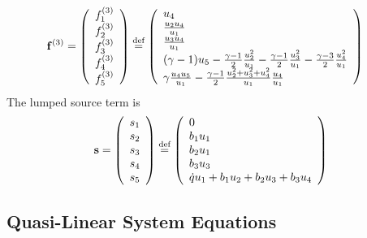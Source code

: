 \documentclass{turgon}
\begin{document}
%
\begin{align}
  \mathbf{f}^{(3)} &= \left(
  \begin{array}{c}
    f^{(3)}_1 \\ f^{(3)}_2 \\ f^{(3)}_3 \\ f^{(3)}_4 \\ f^{(3)}_5
  \end{array}\right) \defeq \left(
  \begin{array}{l}
    u_4                                   \\
    \frac{u_2u_4}{u_1}                    \\
    \frac{u_3u_4}{u_1}                    \\
    (\gamma-1)u_5 - \frac{\gamma-1}{2}\frac{u_2^2}{u_1}
    - \frac{\gamma-1}{2}\frac{u_3^2}{u_1}
    - \frac{\gamma-3}{2}\frac{u_4^2}{u_1} \\
    \gamma\frac{u_4u_5}{u_1}
    - \frac{\gamma-1}{2}\frac{u_2^2+u_3^2+u_4^2}{u_1}\frac{u_4}{u_1}
  \end{array}\right)
  \label{e:euler:flux3}
\end{align}
%
The lumped source term is
\begin{align}
  \mathbf{s} = \left(
  \begin{array}{c}
    s_1 \\ s_2 \\ s_3 \\ s_4 \\ s_5
  \end{array}\right) \defeq \left(
  \begin{array}{l}
    0 \\ b_1u_1 \\ b_2u_1 \\ b_3u_3 \\ \dot{q}u_1 + b_1u_2 + b_2u_3 + b_3u_4
  \end{array}\right)
  \label{e:euler:sterm}
\end{align}

\subsection{Quasi-Linear System Equations}
\end{document}
